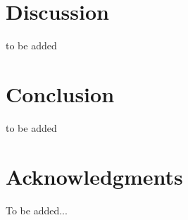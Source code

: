 \documentclass{sig-alternate}
\begin{document}
\section{Discussion}
to be added
\section{Conclusion}
to be added

\section{Acknowledgments}
To be added...
%

%
%

\end{document}
